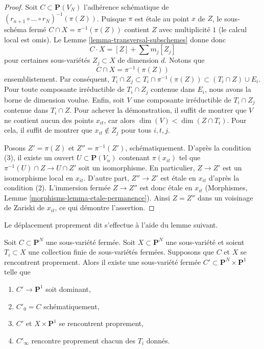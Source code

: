 \begin{proof}
\medskip\noindent
Soit $C \subset \mathbf{P}(V_N)$ l'adhérence schématique de
$(r_{n + 1} \circ \ldots \circ r_N)^{-1}(\pi(Z))$. Puisque $\pi$
est \'etale au point $x$ de $Z$, le sous-schéma fermé
$C \cap X = \pi^{-1}(\pi(Z))$
contient $Z$ avec multiplicité $1$ (le calcul local est omis).
Le Lemme \ref{lemma-transversal-subschemes} donne donc
$$
C \cdot X = [Z] + \sum m_j[Z_j]
$$
pour certaines sous-variétés $Z_j \subset X$ de dimension $d$. Notons que
$$
C \cap X = \pi^{-1}(\pi(Z))
$$
ensemblistement. Par conséquent,
$T_i \cap Z_j \subset T_i \cap \pi^{-1}(\pi(Z)) \subset (T_i \cap Z) \cup E_i$.
Pour toute composante irréductible de $T_i \cap Z_j$ contenue dans $E_i$, nous
avons la borne de dimension voulue. Enfin, soit $V$ une composante irréductible
de $T_i \cap Z_j$ contenue dans $T_i \cap Z$. Pour achever
la démonstration, il suffit de montrer que $V$ ne contient aucun des
points $x_{it}$, car alors $\dim(V) < \dim(Z \cap T_i)$.
Pour cela, il suffit de montrer que $x_{it} \not \in Z_j$
pour tous $i, t, j$.

\medskip\noindent
Posons $Z' = \pi(Z)$ et $Z'' = \pi^{-1}(Z')$, schématiquement. D'après
la condition (3), il existe un ouvert $U \subset \mathbf{P}(V_n)$ contenant
$\pi(x_{it})$ tel que $\pi^{-1}(U) \cap Z \to U \cap Z'$ soit un isomorphisme.
En particulier, $Z \to Z'$ est un isomorphisme local en $x_{it}$.
D'autre part, $Z'' \to Z'$ est \'etale en $x_{it}$ d'après la condition (2).
L'immersion fermée $Z \to Z''$ est donc \'etale en $x_{it}$
(Morphismes, Lemme \ref{morphisms-lemma-etale-permanence}).
Ainsi $Z = Z''$ dans un voisinage de Zariski de $x_{it}$, ce qui démontre
l'assertion.
\end{proof}

\noindent
Le déplacement proprement dit s'effectue à l'aide du lemme suivant.

\begin{lemma}
\label{lemma-move}
Soit $C \subset \mathbf{P}^N$ une sous-variété fermée.
Soit $X \subset \mathbf{P}^N$ une sous-variété et soient $T_i \subset X$
une collection finie de sous-variétés fermées.
Supposons que $C$ et $X$ se rencontrent proprement.
Alors il existe une sous-variété fermée
$C' \subset \mathbf{P}^N \times \mathbf{P}^1$ telle que
\begin{enumerate}
\item $C' \to \mathbf{P}^1$ soit dominant,
\item $C'_0 = C$ schématiquement,
\item $C'$ et $X \times \mathbf{P}^1$ se rencontrent proprement,
\item $C'_\infty$ rencontre proprement chacun des $T_i$ donnés.
\end{enumerate}
\end{lemma}

